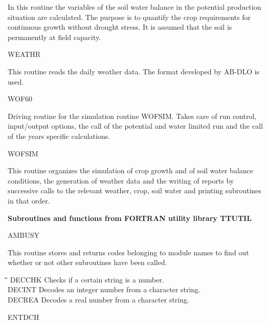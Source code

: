 \begin{indenting}{2.54cm}
In this routine the variables of the soil water balance in the potential
production situation are calculated. The purpose is to quantify the crop
requirements for continuous growth without drought stress. It is as\-sumed
that the soil is permanently at field capacity.
\end{indenting}
WEATHR
\testlastline

\begin{indenting}{2.54cm}
This routine reads the daily weather data. The format developed by AB-DLO is used.
\end{indenting}
WOF60
\testlastline

\begin{indenting}{2.54cm}
Driving routine for the simulation routine WOFSIM. Takes care of run
control, input/output options, the call of the potential and water limited run
and the call of the years specific calculations.
\end{indenting}
WOFSIM
\testlastline

\begin{indenting}{2.54cm}
This routine organizes the simulation of crop growth and of soil water
balance conditions, the generation of weather data and the writing of
reports by successive calls to the relevant weather, crop, soil water and
printing subroutines in that order.
\end{indenting}

\bigskip
\bigskip
\bigskip
\bigskip
{\bf {\large Subroutines and functions from FORTRAN utility library TT\-UTIL}}

AMBUSY
\testlastline

\begin{indenting}{2.54cm}
This routine stores and returns codes belonging to module names to find
out whether or not other subroutines have been called.
\end{indenting}
\begin{tabbing}
\hspace{1.27cm}\=\hspace{1.27cm}\=\hspace{1.27cm}\=\hspace{1.27cm}\=%
\hspace{1.27cm}\=\hspace{1.27cm}\=\hspace{1.27cm}\=\hspace{1.27cm}\=%
\hspace{1.27cm}\=\hspace{1.27cm}\=\kill
DECCHK\> \> Checks if a certain string is a number.\\
DECINT\> \> Decodes an integer number from a character string.\\
DECREA\> \> Decodes a real number from a character string.
\end{tabbing}
ENTDCH
\testlastline


